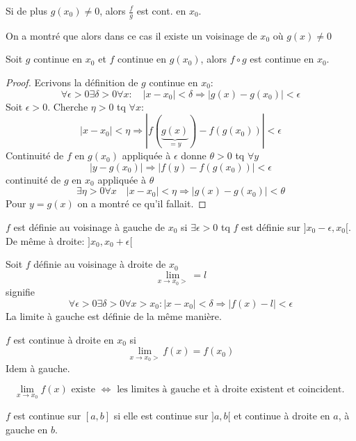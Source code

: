 \documentclass[../main.tex]{subfiles}
\begin{document}
\begin{crly}
	Si de plus $g(x_0) \neq 0$, alors $\frac{f}{g}$ est cont. en $x_0$.
\end{crly}
\begin{rmq}
	On a montré que alors dans ce cas il existe un voisinage de $ x_0$ où $g(x)\neq 0$
\end{rmq}
\begin{propo}
	Soit $g$ continue en $x_0$ et $f$ continue en $g(x_0)$, alors $f\circ g$ est continue en $x_0$.
\end{propo}
\begin{proof}
Ecrivons la définition de $g$ continue en $ x_0$:
\[ 
	\forall \epsilon >0 \exists \delta >0 \forall x: \quad |x-x_0| <\delta \Rightarrow |g(x) -g(x_0)| <\epsilon
\]
Soit $\epsilon >0$. Cherche $\eta >0$ tq $\forall x$:
\[ 
	|x-x_0| < \eta \Rightarrow |f( \underbrace{g(x)}_{=y}) - f(g(x_0))| < \epsilon
\]
Continuité de $f$ en $g(x_0)$ appliquée à $\epsilon$ donne $\theta >0$ tq $\forall y$ 
\[ 
	|y-g(x_0)| \Rightarrow |f(y) - f(g(x_0))| < \epsilon
\]
continuité de $g$ en $x_0$ appliquée à $\theta$ 
\[ 
	\exists \eta >0 \forall x \quad |x-x_0| <\eta \Rightarrow |g(x) - g(x_0)|<\theta
\]
Pour $y=g(x)$ on a montré ce qu'il fallait.

\end{proof}
\begin{defn}
	$f$ est définie au voisinage à gauche de $x_0$ si $\exists \epsilon>0$ tq $f$ est définie sur $]x_0-\epsilon,x_0[$.\\
	De même à droite: $]x_0,x_0+\epsilon[$
\end{defn}
\begin{defn}
	Soit $f$ définie au voisinage à droite de $x_0$ 
	\[ 
	\lim_{x \to x_0>} = l 
	\]
	signifie
	\[ 
		\forall \epsilon>0 \exists \delta>0 \forall x >x_0: |x-x_0| <\delta \Rightarrow |f(x)-l|<\epsilon
	\]
	La limite à gauche est définie de la même manière.
\end{defn}



\begin{defn}
$f$ est continue à droite en $ x_0$ si
\[ 
	\lim_{x \to x_0>} f(x) = f(x_0)
\]
Idem à gauche.
\end{defn}
\begin{exo}
\[ 
	\lim_{x \to x_0} f(x) \text{ existe } \iff \text{ les limites à gauche et à droite existent et coincident. } 
\]

\end{exo}
\begin{defn}
	$f$ est continue sur $[a,b]$ si elle est continue sur $]a,b[$ et continue à droite en $a$, à gauche en $b$.
\end{defn}
\end{document}
